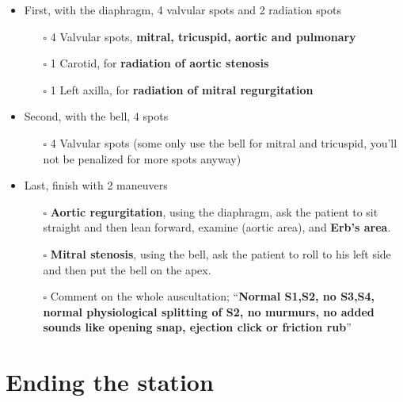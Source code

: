 \documentclass[
  13.5pt,
  a4paper,
  DIV=11,
  numbers=noendperiod]{scrreprt}
\providecommand{\tightlist}{%
  \setlength{\itemsep}{0pt}\setlength{\parskip}{0pt}}
\begin{document}
\begin{itemize}
\tightlist
\item
  First, with the diaphragm, 4 valvular spots and 2 radiation spots

  \begin{itemize}
  \tightlist
  \item[$\square$]
    4 Valvular spots, \textbf{mitral, tricuspid, aortic and pulmonary}
  \item[$\square$]
    1 Carotid, for \textbf{radiation of aortic stenosis}
  \item[$\square$]
    1 Left axilla, for \textbf{radiation of mitral regurgitation}
  \end{itemize}
\item
  Second, with the bell, 4 spots

  \begin{itemize}
  \tightlist
  \item[$\square$]
    4 Valvular spots (some only use the bell for mitral and tricuspid,
    you'll not be penalized for more spots anyway)
  \end{itemize}
\item
  Last, finish with 2 maneuvers

  \begin{itemize}
  \tightlist
  \item[$\square$]
    \textbf{Aortic regurgitation}, using the diaphragm, ask the patient
    to sit straight and then lean forward, examine (aortic area), and
    \textbf{Erb's area}.
  \item[$\square$]
    \textbf{Mitral stenosis}, using the bell, ask the patient to roll to
    his left side and then put the bell on the apex.
  \item[$\square$]
    Comment on the whole auscultation; ``\textbf{Normal S1,S2, no S3,S4,
    normal physiological splitting of S2, no murmurs, no added sounds
    like opening snap, ejection click or friction rub}''
  \end{itemize}
\end{itemize}

\section{Ending the station}\label{ending-the-station}
\end{document}

